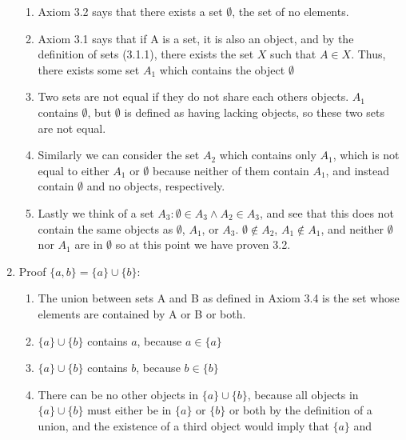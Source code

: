 \documentclass{article}
\begin{document}
\begin{enumerate}
            \begin{enumerate}
                \item Axiom 3.2 says that there exists a set $\emptyset$, the set of no elements.
                \item Axiom 3.1 says that if A is a set, it is also an object,
                    and by the definition of sets (3.1.1), there exists the set $X$
                    such that $A \in X$. Thus, there exists some set $A_1$ which contains the object $\emptyset$
                \item Two sets are not equal if they do not share each others
                    objects. $A_1$ contains $\emptyset$, but $\emptyset$ is
                    defined as having lacking objects, so these two sets are
                    not equal.
                \item Similarly we can consider the set $A_2$ which contains only $A_1$, which is not equal to
                    either $A_1$ or $\emptyset$ because neither of them contain $A_1$, and instead contain
                    $\emptyset$ and no objects, respectively.
                \item Lastly we think of a set $A_3 : \emptyset \in A_3 \land
                    A_2 \in A_3$, and see that this does not contain the same
                    objects as $\emptyset$, $A_1$, or $A_3$. $\emptyset \notin
                    A_2$, $A_1 \notin A_1$, and neither $\emptyset$ nor $A_1$
                    are in $\emptyset$ so at this point we have proven 3.2.
            \end{enumerate}
        \item Proof $\{a,b\} = \{a\} \cup \{b\}$:
            \begin{enumerate}
                \item The union between sets A and B as defined in
                    Axiom 3.4 is the set whose elements are contained by A
                    or B or both.
                \item $\{a\} \cup \{b\}$ contains $a$, because $a \in \{a\}$
                \item $\{a\} \cup \{b\}$ contains $b$, because $b \in \{b\}$
                \item There can be no other objects in  $\{a\} \cup \{b\}$, because 
                    all objects in $\{a\} \cup \{b\}$ must either be in $\{a\}$
                    or $\{b\}$ or both by the definition of a union, and the
                    existence of a third object would imply that $\{a\}$ and

\end{enumerate}
\end{enumerate}
\end{document}
